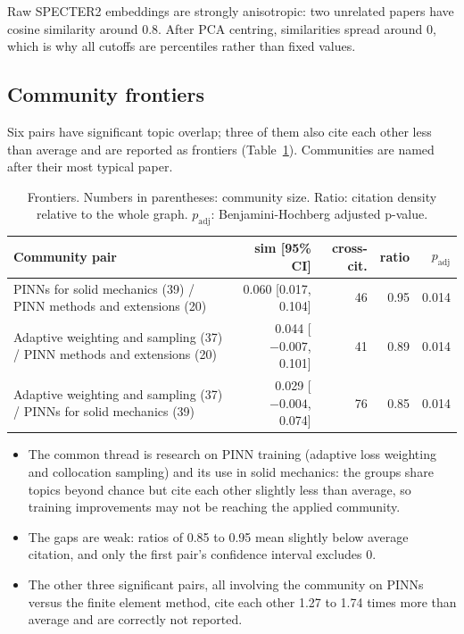 \documentclass[11pt,a4paper]{article}
\begin{document}
Raw SPECTER2 embeddings are strongly anisotropic: two unrelated papers have cosine similarity around 0.8. After PCA centring, similarities spread around 0, which is why all cutoffs are percentiles rather than fixed values.

\subsection{Community frontiers}

Six pairs have significant topic overlap; three of them also cite each other less than average and are reported as frontiers (Table~\ref{tab:frontiers}). Communities are named after their most typical paper.

\begin{table}[h]
\centering
\caption{Frontiers. Numbers in parentheses: community size. Ratio: citation density relative to the whole graph. $p_{\mathrm{adj}}$: Benjamini-Hochberg adjusted p-value.}
\label{tab:frontiers}
\small
\begin{tabularx}{\textwidth}{Xrrrr}
\toprule
Community pair & sim [95\% CI] & cross-cit. & ratio & $p_{\mathrm{adj}}$ \\
\midrule
PINNs for solid mechanics (39) / PINN methods and extensions (20) & 0.060 [0.017, 0.104] & 46 & 0.95 & 0.014 \\
Adaptive weighting and sampling (37) / PINN methods and extensions (20) & 0.044 [$-0.007$, 0.101] & 41 & 0.89 & 0.014 \\
Adaptive weighting and sampling (37) / PINNs for solid mechanics (39) & 0.029 [$-0.004$, 0.074] & 76 & 0.85 & 0.014 \\
\bottomrule
\end{tabularx}
\end{table}

\begin{itemize}
  \item The common thread is research on PINN training (adaptive loss weighting and collocation sampling) and its use in solid mechanics: the groups share topics beyond chance but cite each other slightly less than average, so training improvements may not be reaching the applied community.
  \item The gaps are weak: ratios of 0.85 to 0.95 mean slightly below average citation, and only the first pair's confidence interval excludes 0.
  \item The other three significant pairs, all involving the community on PINNs versus the finite element method, cite each other 1.27 to 1.74 times more than average and are correctly not reported.
\end{itemize}
\end{document}
